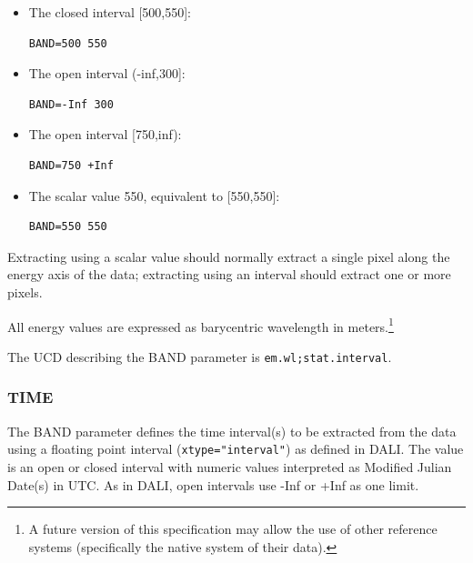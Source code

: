\documentclass[11pt,a4paper]{ivoa}
\newcommand{\ucd}[1]{\texttt{#1}}
\begin{document}
\begin{itemize}
\item The closed interval [500,550]:

\begin{lstlisting}
BAND=500 550
\end{lstlisting}

\item The open interval (-inf,300]:

\begin{lstlisting}
BAND=-Inf 300
\end{lstlisting}

\item The open interval [750,inf):

\begin{lstlisting}
BAND=750 +Inf
\end{lstlisting}

\item The scalar value 550, equivalent to [550,550]:

\begin{lstlisting}
BAND=550 550
\end{lstlisting}

\end{itemize}

Extracting using a scalar value should normally extract a
single pixel along the energy axis of the data; extracting
using an interval should extract one or more pixels.

All energy values are expressed as barycentric wavelength in
meters.\footnote{A future version of this specification may allow the
use of other reference systems (specifically the native
system of their data).}

The UCD describing the BAND parameter is \ucd{em.wl;stat.interval}.


\subsubsection{TIME}
\label{sec:TIME}

The BAND parameter defines the time interval(s) to be extracted from the
data using a floating point interval (\verb|xtype="interval"|) as
defined in DALI.  The value is an open or closed
interval with numeric values interpreted as Modified Julian Date(s) in
UTC. As in DALI, open intervals use -Inf or +Inf as one limit.
\end{document}
